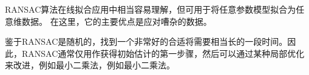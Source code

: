 

RANSAC算法在线拟合应用中相当容易理解，但可用于将任意参数模型拟合为任意维数据。 在这里，它的主要优点是应对嘈杂的数据。

鉴于RANSAC是随机的，找到一个非常好的合适将需要相当长的一段时间。因此，RANSAC通常仅用作获得初始估计的第一步骤，然后可以通过某种局部优化来改进，例如最小二乘法，例如最小二乘法。



